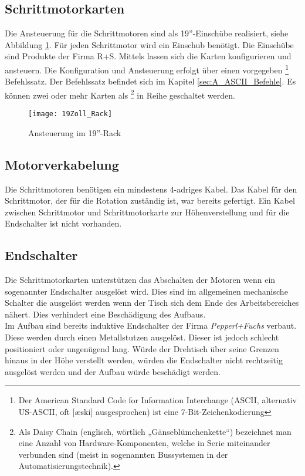 \subsection{Schrittmotorkarten}
\label{sec:Schrittmotorkarten}
Die Ansteuerung für die Schrittmotoren sind als 19''-Einschübe realisiert, siehe Abbildung \ref{fig:19Zoll_Rack}. Für jeden Schrittmotor wird ein Einschub benötigt.
Die Einschübe sind Produkte der Firma R+S. Mittels  lassen sich die Karten konfigurieren und ansteuern. Die Konfiguration und Ansteuerung erfolgt über einen vorgegeben 
\footnote{Der American Standard Code for Information Interchange (ASCII, alternativ US-ASCII, oft [æski] ausgesprochen) ist eine 7-Bit-Zeichenkodierung\cite{wiki:ASCII}}
 Befehlssatz. Der Befehlssatz befindet sich im Kapitel \ref{sec:A_ASCII_Befehle}. Es können zwei oder mehr Karten als 
\footnote{Als Daisy Chain (englisch, wörtlich „Gänseblümchenkette“) bezeichnet man eine Anzahl von Hardware-Komponenten, welche in Serie miteinander verbunden sind (meist in sogenannten Bussystemen in der Automatisierungstechnik).\cite{wiki:Daisy} } in Reihe geschaltet werden. 
\begin{figure}[h]
\centering
\texttt{[image: 19Zoll\_Rack]}
\caption{Ansteuerung im 19''-Rack}
\label{fig:19Zoll_Rack}
\end{figure}
\subsection{Motorverkabelung}
\label{sec:Motorverkabelung}
Die Schrittmotoren benötigen ein mindestens 4-adriges Kabel. Das Kabel für den Schrittmotor, der für die Rotation zuständig ist, war bereits gefertigt. Ein Kabel zwischen Schrittmotor und Schrittmotorkarte zur Höhenverstellung und für die Endschalter ist nicht vorhanden. 


\subsection{Endschalter}
\label{sec:Endschalter}
Die Schrittmotorkarten unterstützen das Abschalten der Motoren wenn ein sogenannter Endschalter ausgelöst wird. Dies sind im allgemeinen mechanische Schalter die ausgelöst werden wenn der Tisch sich dem Ende des Arbeitsbereiches nähert. Dies verhindert eine Beschädigung des Aufbaus.\\
Im Aufbau sind bereits induktive Endschalter der Firma \textit{Pepperl+Fuchs} verbaut. Diese werden durch einen Metallstutzen ausgelöst. Dieser ist jedoch schlecht positioniert oder ungenügend lang. Würde der Drehtisch über seine Grenzen hinaus in der Höhe verstellt werden, würden die Endschalter nicht rechtzeitig ausgelöst werden und der Aufbau würde beschädigt werden.


